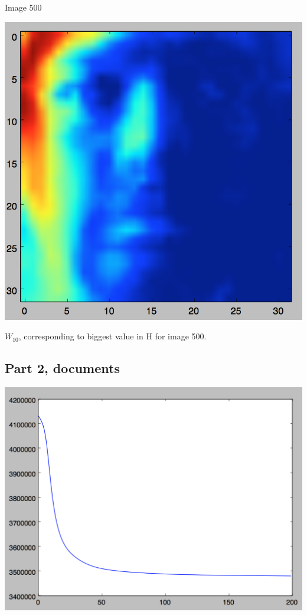 \documentclass[11pt]{article}
\begin{document}
Image 500

\includegraphics[scale=.5]{images/img500_W10}

$W_{10}$, corresponding to biggest value in H for image 500.

\subsection*{Part 2, documents}

\includegraphics[scale=.5]{images/obj_div}
\end{document}
